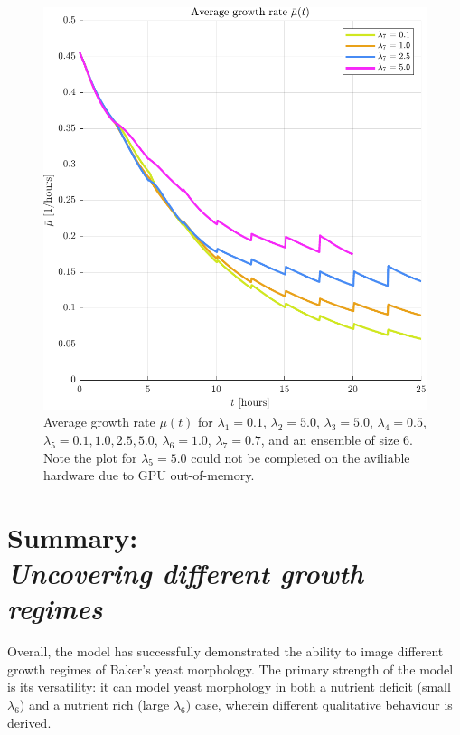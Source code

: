 \begin{figure}[!htb] %
    \centering
    \includegraphics[width= \textwidth]{
        chapter4/figures/Average_mu_EnsembleSize_6o0_L1_0o10_L2_5o00_L3_5o00_L4_0o50_L5_0o10_L6_1o00_L7_0o70.pdf}
    \caption{Average growth rate $\mu(t)$ for 
             $\lambda_1 = 0.1$,  
             $\lambda_2 = 5.0$, 
             $\lambda_3 = 5.0$, 
             $\lambda_4 = 0.5$, 
             $\lambda_5 = 0.1, 1.0, 2.5, 5.0$, 
             $\lambda_6 = 1.0$, 
             $\lambda_7 = 0.7$, and an ensemble of size $6$. Note the plot 
             for $\lambda_5 = 5.0$ could not be completed on the aviliable hardware
             due to GPU out-of-memory.}
    \label{fig:averageMuComparison_varyMobility}
\end{figure}


\section{Summary: \\ \textit{Uncovering different growth regimes}}

Overall, the model has successfully demonstrated the ability 
to image different growth regimes of Baker's yeast morphology.
The primary strength of the model is its versatility:
it can model yeast morphology in both a nutrient deficit (small $\lambda_6$)
and a nutrient rich (large $\lambda_6$) case, wherein 
different qualitative behaviour is derived. 
\\

